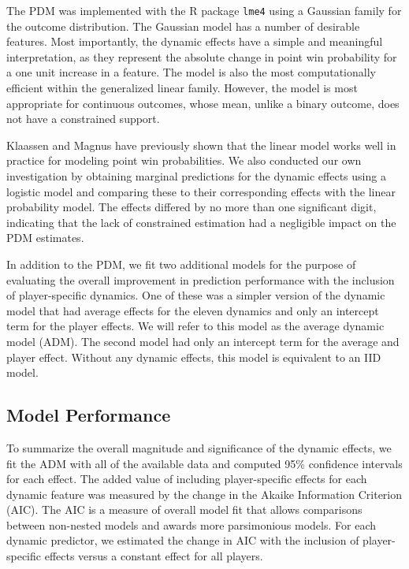 \documentclass{Latex/svjour3}
\begin{document}
The PDM was implemented with the R package \texttt{lme4} using a Gaussian family
for the outcome distribution. The Gaussian model has a number of desirable
features. Most importantly, the dynamic effects have a simple and meaningful
interpretation, as they represent the absolute change in point win probability
for a one unit increase in a feature. The model is also the most computationally
efficient within the generalized linear family. However, the model is most
appropriate for continuous outcomes, whose mean, unlike a binary outcome, does
not have a constrained support.

Klaassen and Magnus have previously shown that the linear model works well in
practice for modeling point win probabilities. We also conducted our own
investigation by obtaining marginal predictions for the dynamic effects using a
logistic model and comparing these to their corresponding effects with the
linear probability model. The effects differed by no more than one significant
digit, indicating that the lack of constrained estimation had a negligible
impact on the PDM estimates.

In addition to the PDM, we fit two additional models for the purpose of
evaluating the overall improvement in prediction performance with the inclusion
of player-specific dynamics. One of these was a simpler version of the dynamic
model that had average effects for the eleven dynamics and only an intercept
term for the player effects. We will refer to this model as the average dynamic
model (ADM). The second model had only an intercept term for the average and
player effect. Without any dynamic effects, this model is equivalent to an IID
model.

\subsection{Model Performance}

To summarize the overall magnitude and significance of the dynamic effects, we
fit the ADM with all of the available data and computed 95\% confidence
intervals for each effect.  The added value of including player-specific effects
for each dynamic feature was measured by the change in the Akaike Information
Criterion (AIC). The AIC is a measure of overall model fit that allows
comparisons between non-nested models and awards more parsimonious models. For
each dynamic predictor, we estimated the change in AIC with the inclusion of
player-specific effects versus a constant effect for all players.
\end{document}
